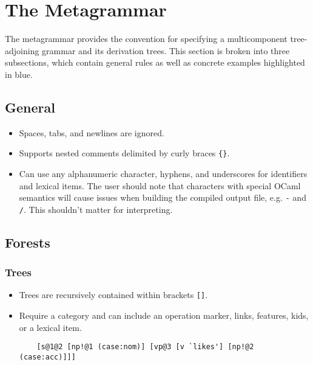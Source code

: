\documentclass[10.5pt]{article}
\newcommand{\code}[1]{\texttt{#1}}
\begin{document}
\section{The Metagrammar}

The metagrammar provides the convention for specifying a multicomponent tree-adjoining grammar and its derivation trees. This section is broken into three subsections, which contain general rules as well as concrete examples highlighted in blue.

\subsection{General}
  \begin{itemize}
    \item Spaces, tabs, and newlines are ignored.
	\item Supports nested comments delimited by curly braces \code{\{\}}.
	\item Can use any alphanumeric character, hyphens, and underscores
	  for identifiers and lexical items. The user should note that
	  characters with special OCaml semantics will cause issues when
	  building the compiled output file, e.g. \code{-} and \code{/}.
	  This shouldn't matter for interpreting.
  \end{itemize}

\subsection{Forests}

\subsubsection{Trees}
  \begin{itemize}
	\item Trees are recursively contained within brackets \code{[]}.
    \item Require a category and can include an operation marker, links, features, kids, or a lexical item.
	  
	\begin{mdframed}[backgroundcolor=blue!5]
	\begin{verbatim}
	[s@1@2 [np!@1 (case:nom)] [vp@3 [v `likes'] [np!@2 (case:acc)]]]
	\end{verbatim}
	\end{mdframed}
  \end{itemize}
  
\end{document}
